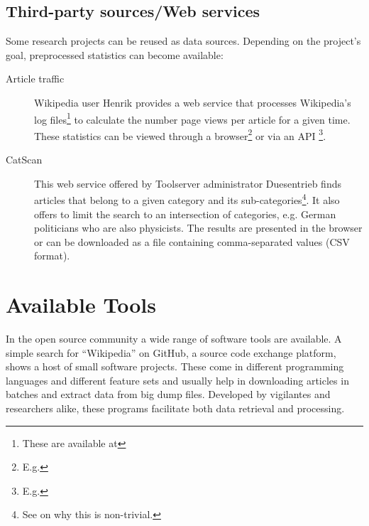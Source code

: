 \subsection{Third-party sources/Web services}

Some research projects can be reused as data sources.
Depending on the project's goal, preprocessed statistics can become available:

\begin{description}
\item[Article traffic] Wikipedia user Henrik provides a web service that processes Wikipedia's log files\footnote{These are available at } to calculate the number page views per article for a given time.
These statistics can be viewed through a browser\footnote{E.g. } or via an API \footnote{E.g. }. 
\item[CatScan] This web service offered by Toolserver administrator Duesentrieb finds articles that belong to a given category and its sub-categories\footnote{See  on why this is non-trivial.}.
It also offers to limit the search to an intersection of categories, e.g. German politicians who are also physicists.
The results are presented in the browser or can be downloaded as a file containing comma-separated values (CSV format). 
\end{description}


\section{Available Tools}

In the open source community a wide range of software tools are available.
A simple search for ``Wikipedia'' on GitHub, a source code exchange platform, shows a host of small software projects.
These come in different programming languages and different feature sets and usually help in downloading articles in batches and extract data from big dump files. 
Developed by vigilantes and researchers alike, these programs facilitate both data retrieval and processing.

